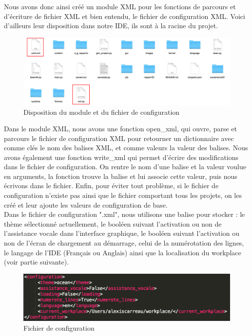 \documentclass[a4paper,12pt]{article}
\begin{document}
Nous avons donc ainsi créé un module XML pour les fonctions de parcours et d'écriture de fichier XML et bien entendu, le fichier de configuration XML. Voici d'ailleurs leur disposition dans notre IDE, ils sont à la racine du projet.

\begin{figure}[h!]
			\begin{center}
				\includegraphics[scale=0.23]{images/imgs_xml/dossier.png}
				\caption{Disposition du module et du fichier de configuration}
			\end{center}
		\end{figure}
		
Dans le module XML, nous avons une fonction open\_xml, qui ouvre, parse et parcours le fichier de configuration XML pour retourner un dictionnaire avec comme clés le nom des balises XML, et comme valeurs la valeur des balises. Nous avons également une fonction write\_xml qui permet d'écrire des modifications dans le fichier de configuration. On rentre le nom d'une balise et la valeur voulue en arguments, la fonction trouve la balise et lui associe cette valeur, puis nous écrivons dans le fichier. Enfin, pour éviter tout problème, si le fichier de configuration n'existe pas ainsi que le fichier comportant tous les projets, on les créé et leur ajoute les valeurs de configuration de base. \\
		
Dans le fichier de configuration ".xml", nous utilisons une balise pour stocker : le thème sélectionné actuellement, le booléen suivant l'activation ou non de l'assistance vocale dans l'interface graphique, le booléen suivant l'activation ou non de l'écran de chargement au démarrage, celui de la numérotation des lignes, le langage de l'IDE (Français ou Anglais) ainsi que la localisation du workplace (voir partie suivante).
		
\begin{figure}[h!]
			\begin{center}
				\includegraphics[scale=0.6]{images/imgs_xml/conf.png}
				\caption{Fichier de configuration}
			\end{center}
		\end{figure}
		
\end{document}
